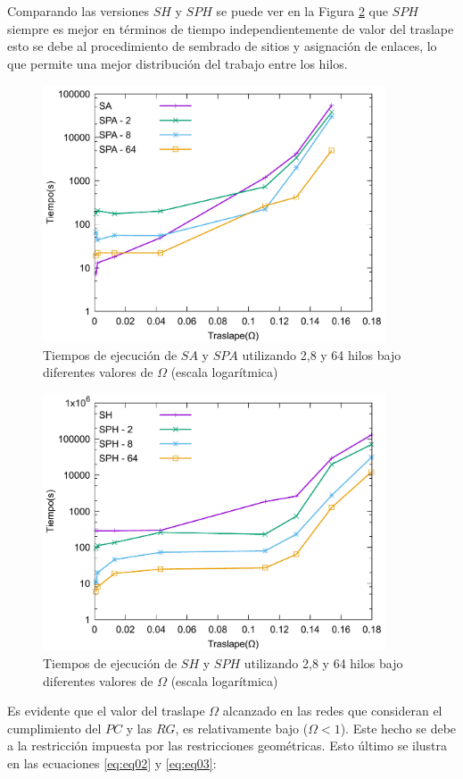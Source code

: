 Comparando las versiones $SH$ y $SPH$ se puede ver en la Figura \ref{fig:traslape-h} que $SPH$ siempre es mejor en términos de tiempo independientemente de valor del traslape esto se debe al procedimiento de sembrado de sitios y asignación de enlaces, lo que permite una mejor distribución del trabajo entre los hilos.\\

\begin{figure}[hbtp]
\centering
\includegraphics[width=4in]{graphs/traslape_mrg}
\caption{Tiempos de ejecución de $SA$ y $SPA$ utilizando 2,8 y 64 hilos bajo diferentes valores de $\Omega$ (escala logarítmica)}
\label{fig:traslape-a}
\end{figure}

\begin{figure}[hbtp]
\centering
\includegraphics[width=4in]{graphs/traslape_hrg}
\caption{Tiempos de ejecución de $SH$ y $SPH$ utilizando 2,8 y 64 hilos bajo diferentes valores de $\Omega$ (escala logarítmica)}
\label{fig:traslape-h}
\end{figure}

Es evidente que el valor del traslape $\Omega$ alcanzado en las redes que consideran el cumplimiento del $PC$ y las $RG$, es relativamente bajo ($\Omega<1$). Este hecho se debe a la restricción impuesta por las restricciones geométricas. Esto último se ilustra en las ecuaciones \ref{eq:eq02} y \ref{eq:eq03}:

